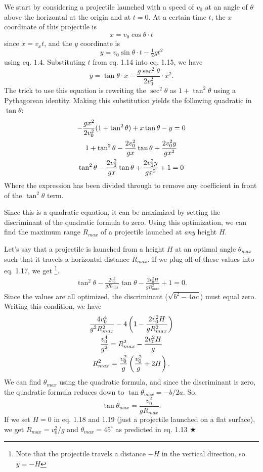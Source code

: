 \noindent We start by considering a projectile launched with a speed of $v_0$ at an angle of $\theta$ above the horizontal at the origin and at $t=0$. At a certain time $t$, the $x$ coordinate of this projectile is
\begin{equation}
    x = v_0\cos \theta \cdot t
\end{equation}
\noindent since $x = v_xt$, and the $y$ coordinate is
\begin{equation}
    y = v_0 \sin \theta \cdot t - \tfrac12 g t^2
\end{equation}
\noindent using eq. $1.4$. Substituting $t$ from eq. 1.14 into eq. 1.15, we have
\begin{equation}
    \boxed{y = \tan \theta \cdot x - \frac{g\sec^2{\theta}}{2v_0^2} \cdot x^2}.
\end{equation}
\noindent The trick to use this equation is rewriting the $\sec^2\theta$ as $1+\tan^2\theta$ using a Pythagorean identity. Making this substitution yields the following quadratic in $\tan \theta$:
\begin{gather}
    -\frac{gx^2}{2v_0^2}(1+\tan^2\theta) + x\tan\theta - y = 0 \nonumber \\
    1 + \tan^2\theta - \frac{2v_0^2}{gx}\tan\theta + \frac{2v_0^2y}{gx^2} \nonumber \\
    \tan^2\theta -\frac{2v_0^2}{gx}\tan\theta + \frac{2v_0^2 y}{gx^2} + 1 = 0
\end{gather}
\noindent Where the expression has been divided through to remove any coefficient in front of the $\tan^2\theta$ term.

\noindent Since this is a quadratic equation, it can be maximized by setting the discriminant of the quadratic formula to zero. Using this optimization, we can find the maximum range $R_{max}$ of a projectile launched at \textit{any} height $H$. 

\noindent Let's say that a projectile is launched from a height $H$ at an optimal angle $\theta_{max}$ such that it travels a horizontal distance $R_{max}$. If we plug all of these values into eq. 1.17, we get \footnote{Note that the projectile travels a distance $-H$ in the vertical direction, so $y=-H$}.
\begin{gather}
    \tan^2\theta -\frac{2v_0^2}{gR_{max}}\tan\theta - \frac{2v_0^2 H}{gR_{max}^2} + 1 = 0.
\end{gather}
\noindent Since the values are all optimized, the discriminant ($\sqrt{b^2 - 4ac}$) must equal zero. Writing this condition, we have
\begin{gather}
    \frac{4v_0^4}{g^2R_{max}^2} - 4\left(1 - \frac{2v_0^2 H}{gR_{max}^2}\right) \nonumber \\
    \frac{v_0^4}{g^2} = R^2_{max} - \frac{2v_0^2H}{g}\nonumber \\
    R_{max}^2 = \frac{v_0^2}{g}\left( \frac{v_0^2}{g} + 2H \right).
\end{gather}
\noindent We can find $\theta_{max}$ using the quadratic formula, and since the discriminant is zero, the quadratic formula reduces down to $\tan\theta_{max} = -b/2a$. So, 
\begin{equation}
    \tan\theta_{max} = \frac{v_0^2}{gR_{max}}.
\end{equation}
\noindent If we set $H=0$ in eq. 1.18 and 1.19 (just a projectile launched on a flat surface), we get $R_{max} = v_0^2/g$ and $\theta_{max} = 45^{\circ}$ as predicted in eq. 1.13 $\bigstar$

